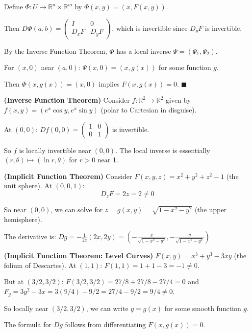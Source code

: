 \documentclass[11pt, letterpaper, openany]{book}
\renewenvironment{proof}[1][\proofname]{%
  \tcolorbox[blanker, breakable, left=1em,
    before skip=1em, after skip=1em,
    borderline west={2pt}{0pt}{MagicTeal!50},
    colback=MagicCream,
    before upper={\textcolor{MagicTeal}{\sffamily\bfseries #1.}\space}
  ]%
}{%
  \hfill\textcolor{MagicTeal}{\ensuremath{\blacksquare}}\endtcolorbox%
}
\begin{document}
\begin{proof}[Sketch]
Define $\Phi: U \to \mathbb{R}^n \times \mathbb{R}^m$ by $\Phi(x, y) = (x, F(x, y))$.

Then $D\Phi(a, b) = \begin{pmatrix} I & 0 \\ D_x F & D_y F \end{pmatrix}$, which is invertible since $D_y F$ is invertible.

By the Inverse Function Theorem, $\Phi$ has a local inverse $\Psi = (\Psi_1, \Psi_2)$.

For $(x, 0)$ near $(a, 0)$: $\Psi(x, 0) = (x, g(x))$ for some function $g$.

Then $\Phi(x, g(x)) = (x, 0)$ implies $F(x, g(x)) = 0$.
\end{proof}

\begin{example}
\textbf{(Inverse Function Theorem)}
Consider $f: \mathbb{R}^2 \to \mathbb{R}^2$ given by $f(x, y) = (e^x \cos y, e^x \sin y)$ (polar to Cartesian in disguise).

At $(0, 0)$: $Df(0,0) = \begin{pmatrix} 1 & 0 \\ 0 & 1 \end{pmatrix}$ is invertible.

So $f$ is locally invertible near $(0,0)$. The local inverse is essentially $(r, \theta) \mapsto (\ln r, \theta)$ for $r > 0$ near 1.
\end{example}

\begin{example}
\textbf{(Implicit Function Theorem)}
Consider $F(x, y, z) = x^2 + y^2 + z^2 - 1$ (the unit sphere). At $(0, 0, 1)$:
\[D_z F = 2z = 2 \neq 0\]

So near $(0, 0)$, we can solve for $z = g(x, y) = \sqrt{1 - x^2 - y^2}$ (the upper hemisphere).

The derivative is: $Dg = -\frac{1}{2z}(2x, 2y) = \left(-\frac{x}{\sqrt{1-x^2-y^2}}, -\frac{y}{\sqrt{1-x^2-y^2}}\right)$
\end{example}

\begin{example}
\textbf{(Implicit Function Theorem: Level Curves)}
$F(x, y) = x^3 + y^3 - 3xy$ (the folium of Descartes). At $(1, 1)$: $F(1,1) = 1 + 1 - 3 = -1 \neq 0$.

But at $(3/2, 3/2)$: $F(3/2, 3/2) = 27/8 + 27/8 - 27/4 = 0$ and $F_y = 3y^2 - 3x = 3(9/4) - 9/2 = 27/4 - 9/2 = 9/4 \neq 0$.

So locally near $(3/2, 3/2)$, we can write $y = g(x)$ for some smooth function $g$.

The formula for $Dg$ follows from differentiating $F(x, g(x)) = 0$.
\end{example}
\end{document}
